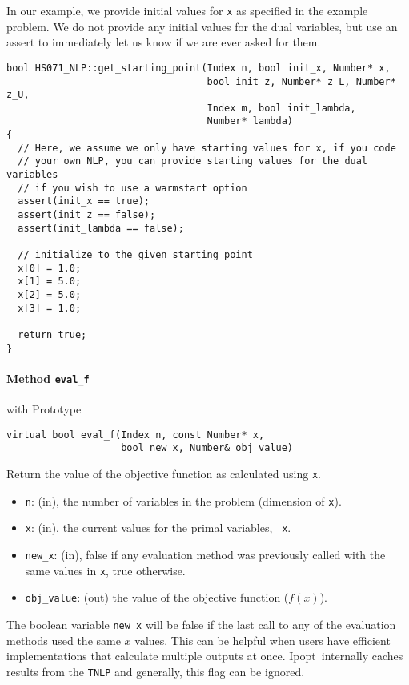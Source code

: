 \documentclass[letter,10pt]{article}
\newcommand{\Ipopt}{{\sc Ipopt}}
\begin{document}
In our example, we provide initial values for {\tt x} as specified in the example
problem. We do not provide any initial values for the dual variables,
but use an assert to immediately let us know if we are ever asked for
them.

\begin{footnotesize}
\begin{verbatim}
bool HS071_NLP::get_starting_point(Index n, bool init_x, Number* x,
                                   bool init_z, Number* z_L, Number* z_U,
                                   Index m, bool init_lambda,
                                   Number* lambda)
{
  // Here, we assume we only have starting values for x, if you code
  // your own NLP, you can provide starting values for the dual variables
  // if you wish to use a warmstart option
  assert(init_x == true);
  assert(init_z == false);
  assert(init_lambda == false);

  // initialize to the given starting point
  x[0] = 1.0;
  x[1] = 5.0;
  x[2] = 5.0;
  x[3] = 1.0;

  return true;
}
\end{verbatim}
\end{footnotesize}

\paragraph{Method {\texttt{eval\_f}}} with Prototype
\begin{verbatim}
virtual bool eval_f(Index n, const Number* x, 
                    bool new_x, Number& obj_value)
\end{verbatim}
Return the value of the objective function as calculated using {\tt x}.
\begin{itemize}
\item {\tt n}: (in), the number of variables in the problem (dimension
  of {\tt x}).
\item {\tt x}: (in), the current values for the primal variables, {\tt
    x}.
\item {\tt new\_x}: (in), false if any evaluation method was
  previously called with the same values in {\tt x}, true otherwise.
\item {\tt obj\_value}: (out) the value of the objective function
  ($f(x)$).
\end{itemize}

The boolean variable {\tt new\_x} will be false if the last call to
any of the evaluation methods used the same $x$ values. This can be
helpful when users have efficient implementations that calculate
multiple outputs at once. \Ipopt\ internally caches results from the
{\tt TNLP} and generally, this flag can be ignored.
\end{document}
